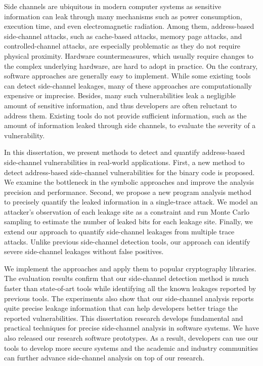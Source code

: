 
\vspace{-0.3in}
Side channels are ubiquitous in modern computer systems as sensitive
information can leak through many mechanisms such as power consumption, 
execution time, and even electromagnetic radiation. Among them, 
address-based side-channel attacks, such as cache-based attacks, 
memory page attacks, and controlled-channel attacks, are especially
problematic as they do not require physical proximity. Hardware 
countermeasures, which usually require changes to the complex 
underlying hardware, are hard to adopt in practice.  On the contrary, 
software approaches are generally easy to implement. While some existing 
tools can detect side-channel leakages, many of these approaches are 
computationally expensive or imprecise. Besides, many such vulnerabilities 
leak a negligible amount of sensitive information, and thus developers 
are often reluctant to address them. Existing tools do not provide sufficient 
information, such as the amount of information leaked through side channels, 
to evaluate the severity of a vulnerability.

In this dissertation, we present methods to detect and quantify 
address-based side-channel vulnerabilities in real-world applications. 
First, a new method to detect address-based side-channel vulnerabilities 
for the binary code is proposed. We examine the bottleneck in the symbolic 
approaches and improve the analysis precision and performance.
Second, we propose a new program analysis method to precisely quantify
the leaked information in a single-trace attack. We model an
attacker’s observation of each leakage site as a constraint and run
Monte Carlo sampling to estimate the number of leaked bits for each
leakage site. Finally, we extend our approach to quantify side-channel 
leakages from multiple trace attacks.  Unlike previous side-channel 
detection tools, our approach can identify severe side-channel
leakages without false positives. 

We implement the approaches and apply them to popular cryptography libraries.  
The evaluation results confirm that our side-channel detection method 
is much faster than state-of-art tools while identifying all the known leakages 
reported by previous tools.
The experiments also show that 
our side-channel analysis reports quite precise leakage information
that can help developers better triage the reported vulnerabilities.
This dissertation research develops fundamental and practical techniques for precise side-channel 
analysis in software systems. We have also released our research software prototypes.
As a result, developers can use our tools to develop more secure systems and the academic and industry
communities can further advance side-channel analysis on top of our research.